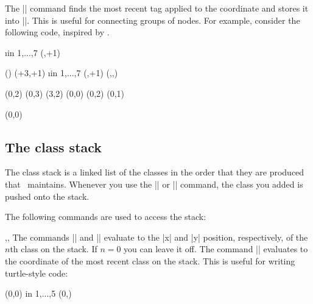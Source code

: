 \begin{sseqdata}[name = basic, cohomological Serre grading]
\begin{command}{\gettag{}}
The |\gettag| command finds the most recent tag applied to the coordinate and stores it into ||. This is useful for connecting groups of nodes. For example, consider the following code, inspired by .
\begin{codeexample}[width=6cm]
\DeclareSseqCommand {} {
    \begin{scope}[#1]
    \foreach\i in {1,...,7}{
        \class(\lastx,\lasty+1)
        \structline
    }
    \end{scope}
    \restorestack
}
\DeclareSseqCommand {} {
    \begin{scope}[#1]
    \gettag\thetag(\lastclass)
    \class(\lastx+3,\lasty+1)
    \structline[gray]
    \savestack
    \foreach\i in {1,...,7}{
        \class(\lastx,\lasty+1)
        \structline
        \structline[gray](,,\thetag)
    }
    \restorestack
    \end{scope}
}
\begin{sseqpage}[ y range = {0}{6}, x tick step = 3,
    xscale=0.6, yscale=1.3 ]
\class(0,2) \class(0,3) \class(3,2)
\class[tag = h_0^i](0,0)
\tower[tag = h_0^i]
\class(0,2) \class(0,1)

\htwotower[tag = h_2 h_0^i](0,0)
\htwotower[tag = h_2 h_0^i]
\end{sseqpage}
\end{codeexample}
\end{command}


\subsection{The class stack}
\label{sec:class stack}
The class stack is a linked list of the classes in the order that they are produced that \sseqpages\  maintains. Whenever you use the |\class| or |\replaceclass| command, the class you added is pushed onto the stack.

The following commands are used to access the stack:

\begin{commandlist}{\lastx{},\lasty{},\lastclass{}}
The commands |\lastx| and |\lasty| evaluate to the |x| and |y| position, respectively, of the $n$th class on the stack. If $n = 0$ you can leave it off.
The command |\lastclass| evaluates to the coordinate of the most recent class on the stack. This is useful for writing turtle-style code:
\begin{codeexample}[width=6cm]
\DeclareSseqCommand {}
\DeclareSseqCommand {}
\begin{sseqpage}
\class(0,0)
\savestack
\foreach \y in { 1,...,5 }{
    \class(0,\y)
    \structline
}
\restorestack
\etaclass\etaclass\etaclass
\divtwoclass\divtwoclass
\end{sseqpage}
\end{codeexample}


\end{commandlist}
\end{sseqdata}
